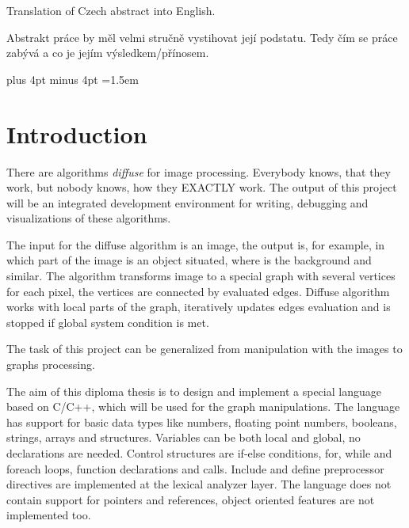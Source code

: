 \documentclass[11pt,twoside,a4paper]{book}
\begin{document}
\abstractpage

Translation of Czech abstract into English.


\vspace{8ex}

\noindent
Abstrakt práce by měl velmi stručně vystihovat její podstatu. Tedy čím se práce zabývá a co je jejím výsledkem/přínosem.




\tableofcontents
\listoffigures
\listoftables



\mainbodystarts

\parskip=5pt plus 4pt minus 4pt
\parindent=1.5em



\chapter{Introduction}

There are algorithms \textit{diffuse} for image processing. Everybody knows, that they work, but nobody knows, how they EXACTLY work. The output of this project will be an integrated development environment for writing, debugging and visualizations of these algorithms.

The input for the diffuse algorithm is an image, the output is, for example, in which part of the image is an object situated, where is the background and similar. The algorithm transforms image to a special graph with several vertices for each pixel, the vertices are connected by evaluated edges. Diffuse algorithm works with local parts of the graph, iteratively updates edges evaluation and is stopped if global system condition is met.

The task of this project can be generalized from manipulation with the images to graphs processing.

The aim of this diploma thesis is to design and implement a special language based on C/C++, which will be used for the graph manipulations. The language has support for basic data types like numbers, floating point numbers, booleans, strings, arrays and structures. Variables can be both local and global, no declarations are needed. Control structures are if-else conditions, for, while and foreach loops, function declarations and calls. Include and define preprocessor directives are implemented at the lexical analyzer layer. The language does not contain support for pointers and references, object oriented features are not implemented too.
\end{document}
